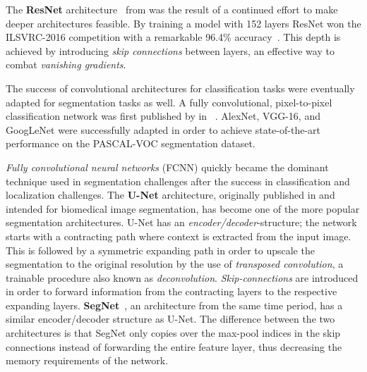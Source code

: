 The \textbf{ResNet} architecture~\cite{resnet} from \citeyear{resnet} was the result of a continued effort to make deeper architectures feasible.
By training a model with 152 layers ResNet won the ILSVRC-2016 competition with a remarkable 96.4\% accuracy~\cite{segmentation-overview}.
This depth is achieved by introducing \textit{skip connections} between layers, an effective way to combat \textit{vanishing gradients}.

The success of convolutional architectures for classification tasks were eventually adapted for segmentation tasks as well.
A fully convolutional, pixel-to-pixel classification network was first published by \citeauthor{segmentation-fcnn} in \citeyear{segmentation-fcnn}~\cite{segmentation-fcnn}.
AlexNet, VGG-16, and GoogLeNet were successfully adapted in order to achieve state-of-the-art performance on the PASCAL-VOC segmentation dataset.

\textit{Fully convolutional neural networks} (FCNN) quickly became the dominant technique used in segmentation challenges after the success in classification and localization challenges.
The \textbf{U-Net} architecture, originally published in \citeyear{segmentation-unet} and intended for biomedical image segmentation, has become one of the more popular segmentation architectures.
U-Net has an \textit{encoder/decoder}-structure; the network starts with a contracting path where context is extracted from the input image.
This is followed by a symmetric expanding path in order to upscale the segmentation to the original resolution by the use of \textit{transposed convolution}, a trainable procedure also known as \textit{deconvolution}.
\textit{Skip-connections} are introduced in order to forward information from the contracting layers to the respective expanding layers.
\textbf{SegNet}~\cite{segmentation-segnet}, an architecture from the same time period, has a similar encoder/decoder structure as U-Net.
The difference between the two architectures is that SegNet only copies over the max-pool indices in the skip connections instead of forwarding the entire feature layer, thus decreasing the memory requirements of the network.

